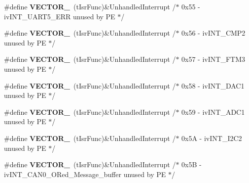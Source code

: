\begin{DoxyCompactItemize}
\item 
\#define {\bfseries V\+E\+C\+T\+O\+R\+\_}~(t\+Isr\+Func)\&Unhandled\+Interrupt         /$\ast$ 0x55 -\/    iv\+I\+N\+T\+\_\+\+U\+A\+R\+T5\+\_\+\+E\+R\+R                unused by P\+E $\ast$/\hypertarget{group___vectors___config__module_ga7eb7770dde3df09c70a2fc25d41b9617}{}\label{group___vectors___config__module_ga7eb7770dde3df09c70a2fc25d41b9617}

\item 
\#define {\bfseries V\+E\+C\+T\+O\+R\+\_}~(t\+Isr\+Func)\&Unhandled\+Interrupt         /$\ast$ 0x56 -\/    iv\+I\+N\+T\+\_\+\+C\+M\+P2                     unused by P\+E $\ast$/\hypertarget{group___vectors___config__module_ga12553fffcde02241513d386fbbccef25}{}\label{group___vectors___config__module_ga12553fffcde02241513d386fbbccef25}

\item 
\#define {\bfseries V\+E\+C\+T\+O\+R\+\_}~(t\+Isr\+Func)\&Unhandled\+Interrupt         /$\ast$ 0x57 -\/    iv\+I\+N\+T\+\_\+\+F\+T\+M3                     unused by P\+E $\ast$/\hypertarget{group___vectors___config__module_gaa8a95060ebd339c2915ff09afb8f2283}{}\label{group___vectors___config__module_gaa8a95060ebd339c2915ff09afb8f2283}

\item 
\#define {\bfseries V\+E\+C\+T\+O\+R\+\_}~(t\+Isr\+Func)\&Unhandled\+Interrupt         /$\ast$ 0x58 -\/    iv\+I\+N\+T\+\_\+\+D\+A\+C1                     unused by P\+E $\ast$/\hypertarget{group___vectors___config__module_gaa2c1c67381622886d9fcddad806b8773}{}\label{group___vectors___config__module_gaa2c1c67381622886d9fcddad806b8773}

\item 
\#define {\bfseries V\+E\+C\+T\+O\+R\+\_}~(t\+Isr\+Func)\&Unhandled\+Interrupt         /$\ast$ 0x59 -\/    iv\+I\+N\+T\+\_\+\+A\+D\+C1                     unused by P\+E $\ast$/\hypertarget{group___vectors___config__module_ga9d91466a5e234c4c7ef35b52a268ef19}{}\label{group___vectors___config__module_ga9d91466a5e234c4c7ef35b52a268ef19}

\item 
\#define {\bfseries V\+E\+C\+T\+O\+R\+\_}~(t\+Isr\+Func)\&Unhandled\+Interrupt         /$\ast$ 0x5\+A -\/    iv\+I\+N\+T\+\_\+\+I2\+C2                     unused by P\+E $\ast$/\hypertarget{group___vectors___config__module_gab104ee8d8b2c48ff8c681467167a1661}{}\label{group___vectors___config__module_gab104ee8d8b2c48ff8c681467167a1661}

\item 
\#define {\bfseries V\+E\+C\+T\+O\+R\+\_}~(t\+Isr\+Func)\&Unhandled\+Interrupt         /$\ast$ 0x5\+B -\/    iv\+I\+N\+T\+\_\+\+C\+A\+N0\+\_\+\+O\+Red\+\_\+\+Message\+\_\+buffer unused by P\+E $\ast$/\hypertarget{group___vectors___config__module_ga6a4058dba41db09a7008392c7c8189ee}{}\label{group___vectors___config__module_ga6a4058dba41db09a7008392c7c8189ee}


\end{DoxyCompactItemize}
